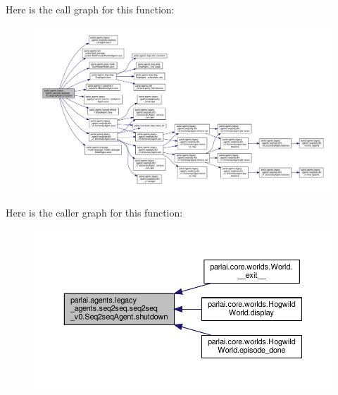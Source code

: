 Here is the call graph for this function\+:
\nopagebreak
\begin{figure}[H]
\begin{center}
\leavevmode
\includegraphics[width=350pt]{classparlai_1_1agents_1_1legacy__agents_1_1seq2seq_1_1seq2seq__v0_1_1Seq2seqAgent_a86c41e705170f0b2e56a5bbc378aead9_cgraph}
\end{center}
\end{figure}
Here is the caller graph for this function\+:
\nopagebreak
\begin{figure}[H]
\begin{center}
\leavevmode
\includegraphics[width=350pt]{classparlai_1_1agents_1_1legacy__agents_1_1seq2seq_1_1seq2seq__v0_1_1Seq2seqAgent_a86c41e705170f0b2e56a5bbc378aead9_icgraph}
\end{center}
\end{figure}
\mbox{\label{classparlai_1_1agents_1_1legacy__agents_1_1seq2seq_1_1seq2seq__v0_1_1Seq2seqAgent_a3933d4fdc5e603b1a168d92e7da77151}} 
